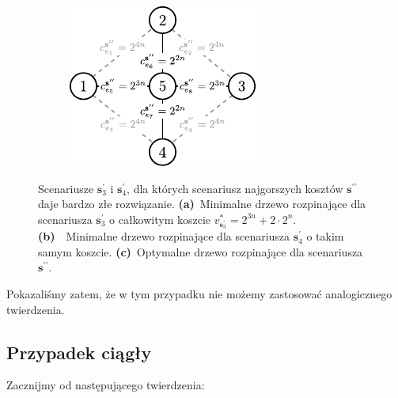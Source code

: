 \begin{figure}[!htbp]
\begin{subfigure}[b]{0.3\textwidth}
		\label{fig:minmaxregexample3:b}
	\end{subfigure}
	\hfill
	\begin{subfigure}[b]{0.3\textwidth}
		\includegraphics[width=\textwidth]{Chapter_II/MIN-MAX-REG3-example/c}
		\caption{}
		\label{fig:minmaxregexample3:c}
	\end{subfigure}
	\hfill\null
	\caption{
		Scenariusze $\textbf{s}_{3}^{\prime}$ i $\textbf{s}_{4}^{\prime}$, dla których scenariusz najgorszych kosztów $\textbf{s}^{\prime\prime}$ daje bardzo złe rozwiązanie.
		\textbf{(a)}~Minimalne drzewo rozpinające dla scenariusza $\textbf{s}_{3}^{\prime}$ o całkowitym koszcie $v^{\ast}_{\textbf{s}_{3}^{\prime}} = 2^{3n} + 2 \cdot 2^{n}$.
		\textbf{(b)}~~Minimalne drzewo rozpinające dla scenariusza $\textbf{s}_{4}^{\prime}$ o takim samym koszcie.
		\textbf{(c)}~Optymalne drzewo rozpinające dla scenariusza $\textbf{s}^{\prime\prime}$.
	}
	\label{fig:minmaxregexample3}
\end{figure}

Pokazaliśmy zatem, że w tym przypadku nie możemy zastosować analogicznego twierdzenia.

\subsection{Przypadek ciągły}

Zacznijmy od następującego twierdzenia:

